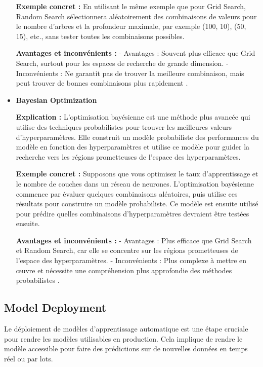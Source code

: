 \documentclass[10pt,a4paper]{article}
\begin{document}
\begin{itemize}
    \textbf{Exemple concret :}
    En utilisant le même exemple que pour Grid Search, Random Search sélectionnera aléatoirement des combinaisons de valeurs pour le nombre d'arbres et la profondeur maximale, par exemple (100, 10), (50, 15), etc., sans tester toutes les combinaisons possibles.

    \textbf{Avantages et inconvénients :}
    - Avantages : Souvent plus efficace que Grid Search, surtout pour les espaces de recherche de grande dimension.
    - Inconvénients : Ne garantit pas de trouver la meilleure combinaison, mais peut trouver de bonnes combinaisons plus rapidement \cite{hyperparameter_tuning}.

    \item \textbf{Bayesian Optimization}

    \textbf{Explication :}
    L'optimisation bayésienne est une méthode plus avancée qui utilise des techniques probabilistes pour trouver les meilleures valeurs d'hyperparamètres. Elle construit un modèle probabiliste des performances du modèle en fonction des hyperparamètres et utilise ce modèle pour guider la recherche vers les régions prometteuses de l'espace des hyperparamètres.

    \textbf{Exemple concret :}
    Supposons que vous optimisez le taux d'apprentissage et le nombre de couches dans un réseau de neurones. L'optimisation bayésienne commence par évaluer quelques combinaisons aléatoires, puis utilise ces résultats pour construire un modèle probabiliste. Ce modèle est ensuite utilisé pour prédire quelles combinaisons d'hyperparamètres devraient être testées ensuite.

    \textbf{Avantages et inconvénients :}
    - Avantages : Plus efficace que Grid Search et Random Search, car elle se concentre sur les régions prometteuses de l'espace des hyperparamètres.
    - Inconvénients : Plus complexe à mettre en œuvre et nécessite une compréhension plus approfondie des méthodes probabilistes \cite{hyperparameter_tuning}.
\end{itemize}


\subsection*{Model Deployment}

Le déploiement de modèles d'apprentissage automatique est une étape cruciale pour rendre les modèles utilisables en production. Cela implique de rendre le modèle accessible pour faire des prédictions sur de nouvelles données en temps réel ou par lots.
\end{document}
